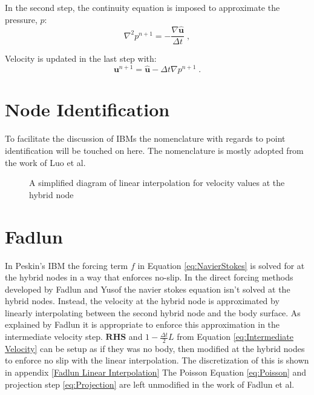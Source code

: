 \documentclass[onehalf,11pt]{beavtex}
\begin{document}
In the second step, the continuity equation is imposed to approximate the pressure, $p$:
\begin{equation}\label{eq:Poisson}
\nabla^2p^{n+1} = - \frac{\nabla\hat{\textbf{u}}}{\Delta t} \;,
\end{equation}

Velocity is updated in the last step with:
\begin{equation}\label{eq:Projection}
\textbf{u}^{n+1} = \hat{\textbf{u}} - \Delta t\nabla p^{n+1} \;.
\end{equation}

\section{Node Identification}
To facilitate the discussion of IBMs the nomenclature with regards to point identification will be touched on here. 
The nomenclature is mostly adopted from the work of Luo et al.\cite{Luo:2012gx}

\begin{figure}[htb] %
    \centering
    
    \caption{A simplified diagram of linear interpolation for velocity values at the hybrid node}
    \label{fig:2}
\end{figure}

\section{Fadlun}
In Peskin's\cite{Peskin:1972gh} IBM the forcing term $f$ in Equation \eqref{eq:NavierStokes} is solved for at the hybrid nodes in a way that enforces no-slip. 
In the direct forcing methods developed by Fadlun\cite{Fadlun:2000fl} and Yusof\cite{MohdYusof:1997wh} the navier stokes equation isn't solved at the hybrid nodes. 
Instead, the velocity at the hybrid node is approximated by linearly interpolating between the second hybrid node and the body surface. 
As explained by Fadlun it is appropriate to enforce this approximation in the intermediate velocity step.
$\textbf{RHS}$ and $1-\frac{\Delta t}{2}L$ from Equation \eqref{eq:Intermediate Velocity} can be setup as if they was no body, then modified at the hybrid nodes to enforce no slip with the linear interpolation.
The discretization of this is shown in appendix \ref{Fadlun Linear Interpolation}
The Poisson Equation \ref{eq:Poisson} and projection step \ref{eq:Projection} are left unmodified in the work of Fadlun et al.
\end{document}
